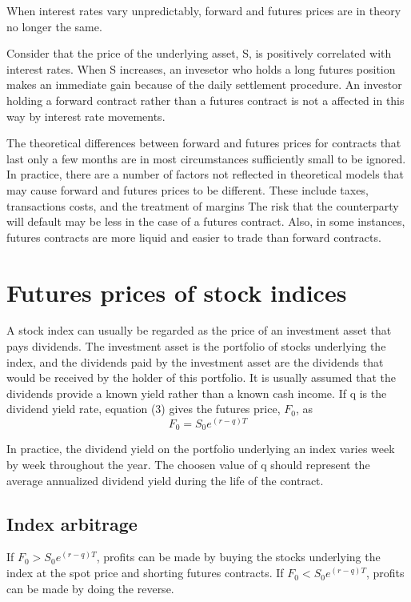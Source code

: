 \documentclass{article}
\begin{document}
When interest rates vary unpredictably, forward and futures prices are in theory no longer the same.

Consider that the price of the underlying asset, S, is positively correlated with interest rates. When S increases, an invesetor who holds a long futures position makes an immediate gain because of the daily settlement procedure. An investor holding a forward contract rather than a futures contract is not a affected in this way by interest rate movements.

The theoretical differences between forward and futures prices for contracts that last only a few months are in most circumstances sufficiently small to be ignored. In practice, there are a number of  factors not reflected in theoretical models that may cause forward and futures prices to be different. These include taxes, transactions costs, and the treatment of margins The risk that the counterparty will default may be less in the case of a futures contract. Also, in some instances, futures contracts are more liquid and easier to trade than forward contracts.

\section{Futures prices of stock indices}
A stock index can usually be regarded as the price of an investment asset that pays dividends. The investment asset is the portfolio of stocks underlying the index, and the dividends paid by the investment asset are the dividends that would be received by the holder of this portfolio. It is usually assumed that the dividends provide a known yield rather than a known cash income. If q is the dividend yield rate, equation (3) gives the futures price, $ F_0 $, as
\begin{equation}
	F_0=S_0e^{(r-q)T}
\end{equation}

In practice, the dividend yield on the portfolio underlying an index varies week by week throughout the year. The choosen value of q should represent the average annualized dividend yield during the life of the contract.

\subsection{Index arbitrage}
If $ F_0>S_0e^{(r-q)T} $, profits can be made by buying the stocks underlying the index at the spot price and shorting futures contracts. If $ F_0<S_0e^{(r-q)T} $, profits can be made by doing the reverse.
\end{document}
